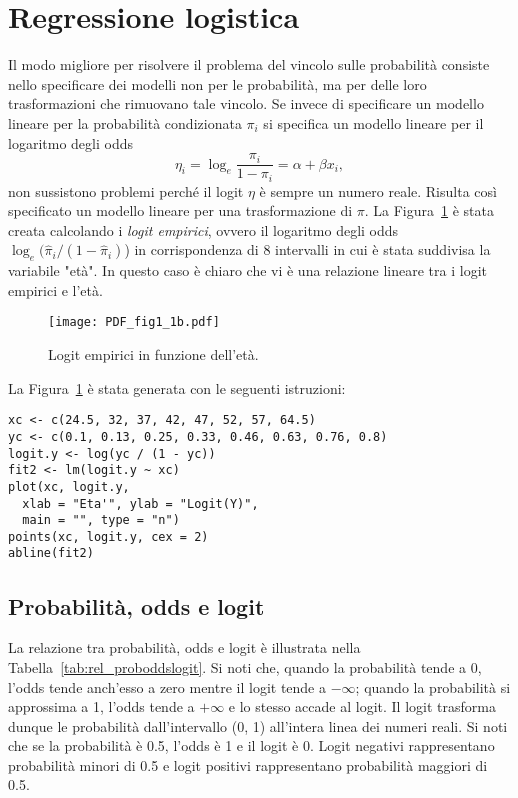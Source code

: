 \section{Regressione logistica}

Il modo migliore per risolvere il problema del vincolo sulle probabilità consiste nello specificare dei modelli non per le probabilità, ma per delle loro trasformazioni che rimuovano tale vincolo. Se invece di specificare un modello lineare per la probabilità condizionata $\pi_i$ si specifica un modello lineare per il logaritmo degli odds
  \[
  \eta_i = \log_e \frac{\pi_i}{1-\pi_i}= \alpha + \beta x_i,
  \]
non sussistono problemi perché il logit $\eta$ è sempre un numero reale. Risulta così specificato un modello lineare per una trasformazione di $\pi$. La Figura~\ref{fig:logit_empirici} è stata creata calcolando i \emph{logit empirici}, ovvero il logaritmo degli odds $\log_e(\hat{\pi}_i/(1-\hat{\pi}_i)$) in corrispondenza di 8 intervalli in cui è stata suddivisa la variabile "età". In questo caso è chiaro che vi è una relazione lineare tra i logit empirici e l'età.

\begin{figure}[p!h!b!]
  \begin{center}
    \texttt{[image: PDF\_fig1\_1b.pdf]}
  \end{center}
\caption{Logit empirici in funzione dell'età.}
\label{fig:logit_empirici}
\end{figure}

La Figura~\ref{fig:logit_empirici} è stata generata con le seguenti istruzioni:
\begin{lstlisting}
xc <- c(24.5, 32, 37, 42, 47, 52, 57, 64.5) 
yc <- c(0.1, 0.13, 0.25, 0.33, 0.46, 0.63, 0.76, 0.8) 
logit.y <- log(yc / (1 - yc)) 
fit2 <- lm(logit.y ~ xc) 
plot(xc, logit.y, 
  xlab = "Eta'", ylab = "Logit(Y)", 
  main = "", type = "n") 
points(xc, logit.y, cex = 2) 
abline(fit2)
\end{lstlisting}

\subsection{Probabilità, odds e logit}

La relazione tra probabilità, odds e logit è illustrata nella Tabella~\ref{tab:rel_proboddslogit}. Si noti che, quando la probabilità tende a 0, l'odds tende anch'esso a zero mentre il logit tende a $-\infty$; quando la probabilità si approssima a 1, l'odds tende a $+\infty$ e lo stesso accade al logit. 
Il logit trasforma dunque le probabilità dall'intervallo (0, 1) all'intera linea dei numeri reali. Si noti che se la probabilità è 0.5, l'odds è 1 e il logit è 0. Logit negativi rappresentano probabilità minori di 0.5 e logit positivi rappresentano probabilità maggiori di 0.5.

